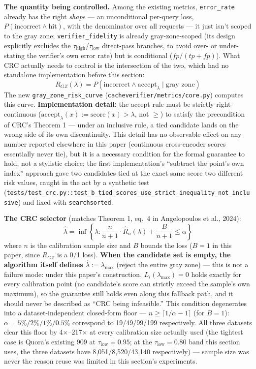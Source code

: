 \documentclass[11pt]{article}
\newcommand{\taulow}{\ensuremath{\tau_{\text{low}}}}
\newcommand{\tauhigh}{\ensuremath{\tau_{\text{high}}}}
\begin{document}
\textbf{The quantity being controlled.} Among the existing metrics, \texttt{error\_\allowbreak{}rate} already has the right \emph{shape} --- an unconditional per-query loss, $P(\text{incorrect} \wedge \text{hit})$, with the denominator over all requests --- it just isn't scoped to the gray zone; \texttt{verifier\_\allowbreak{}fidelity} is already gray-zone-scoped (its design explicitly excludes the $\tauhigh$/$\taulow$ direct-pass branches, to avoid over- or under-stating the verifier's own error rate) but is conditional ($fp/(tp+fp)$). What CRC actually needs to control is the intersection of the two, which had no standalone implementation before this section:
\[
R_{GZ}(\lambda) = P(\text{incorrect} \wedge \text{accept}_\lambda \mid \text{gray zone})
\]
The new \texttt{gray\_\allowbreak{}zone\_\allowbreak{}risk\_\allowbreak{}curve} (\texttt{cacheverifier/\allowbreak{}metrics/\allowbreak{}core.\allowbreak{}py}) computes this curve. \textbf{Implementation detail:} the accept rule must be strictly right-continuous ($\text{accept}_\lambda(x) := \text{score}(x) > \lambda$, not $\ge$) to satisfy the precondition of CRC's Theorem 1 --- under an inclusive rule, a tied candidate lands on the wrong side of its own discontinuity. This detail has no observable effect on any number reported elsewhere in this paper (continuous cross-encoder scores essentially never tie), but it is a necessary condition for the formal guarantee to hold, not a stylistic choice; the first implementation's ``subtract the point's own index'' approach gave two candidates tied at the exact same score two different risk values, caught in the act by a synthetic test (\texttt{tests/\allowbreak{}test\_\allowbreak{}crc.\allowbreak{}py:\allowbreak{}:\allowbreak{}test\_\allowbreak{}b\_\allowbreak{}tied\_\allowbreak{}scores\_\allowbreak{}use\_\allowbreak{}strict\_\allowbreak{}inequality\_\allowbreak{}not\_\allowbreak{}inclusive}) and fixed with \texttt{searchsorted}.

\textbf{The CRC selector} (matches Theorem 1, eq.~4 in Angelopoulos et al., 2024):
\[
\hat\lambda = \inf\left\{ \lambda : \frac{n}{n+1}\cdot \hat{R}_n(\lambda) + \frac{B}{n+1} \le \alpha \right\}
\]
where $n$ is the calibration sample size and $B$ bounds the loss ($B=1$ in this paper, since $R_{GZ}$ is a 0/1 loss). \textbf{When the candidate set is empty, the algorithm itself defines $\hat\lambda := \lambda_{\max}$} (reject the entire gray zone) --- this is not a failure mode: under this paper's construction, $L_i(\lambda_{\max})=0$ holds exactly for every calibration point (no candidate's score can strictly exceed the sample's own maximum), so the guarantee still holds even along this fallback path, and it should never be described as ``CRC being infeasible.'' This condition degenerates into a dataset-independent closed-form floor --- $n \ge \lceil 1/\alpha - 1 \rceil$ (for $B=1$): $\alpha = 5\%/2\%/1\%/0.5\%$ correspond to 19/49/99/199 respectively. All three datasets clear this floor by 4$\times$--217$\times$ at every calibration size actually used (the tightest case is Quora's existing 909 at $\taulow=0.95$; at the $\taulow=0.80$ band this section uses, the three datasets have 8{,}051/8{,}520/43{,}140 respectively) --- sample size was never the reason reuse was limited in this section's experiments.
\end{document}
